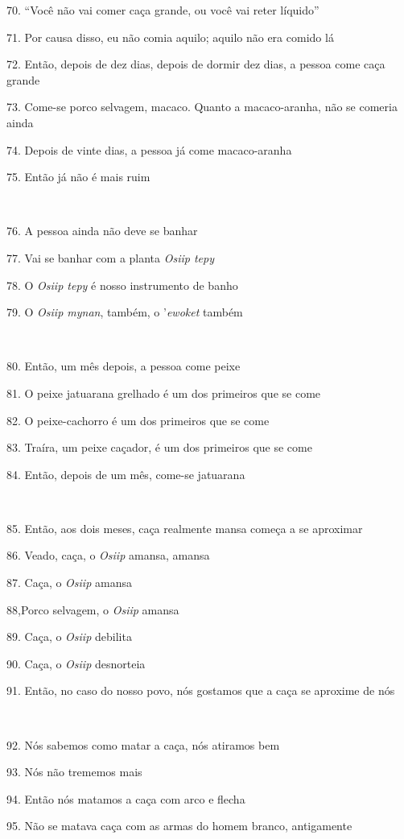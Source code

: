 70. ``Você não vai comer caça grande, ou você vai reter líquido''

71. Por causa disso, eu não comia aquilo; aquilo não era comido lá

72. Então, depois de dez dias, depois de dormir dez dias, a pessoa come
caça grande

73. Come-se porco selvagem, macaco. Quanto a macaco-aranha, não se comeria ainda

74. Depois de vinte dias, a pessoa já come macaco-aranha

75. Então já não é mais ruim

~

76. A pessoa ainda não deve se banhar

77. Vai se banhar com a planta \emph{Osiip tepy}

78. O \emph{Osiip tepy} é nosso instrumento de banho

79. O \emph{Osiip mynan}, também, o '\emph{ewoket} também

~

80. Então, um mês depois, a pessoa come peixe

81. O peixe jatuarana grelhado é um dos primeiros que se come

82. O peixe-cachorro é um dos primeiros que se come

83. Traíra, um peixe caçador, é um dos primeiros que se come

84. Então, depois de um mês, come-se jatuarana

~

85. Então, aos dois meses, caça realmente mansa começa a se aproximar

86. Veado, caça, o \emph{Osiip} amansa, amansa

87. Caça, o \emph{Osiip} amansa

88,Porco selvagem, o \emph{Osiip} amansa

89. Caça, o \emph{Osiip} debilita

90. Caça, o \emph{Osiip} desnorteia

91. Então, no caso do nosso povo, nós gostamos que a caça se aproxime de nós

~

92. Nós sabemos como matar a caça, nós atiramos bem

93. Nós não trememos mais

94. Então nós matamos a caça com arco e flecha

95. Não se matava caça com as armas do homem branco, antigamente

